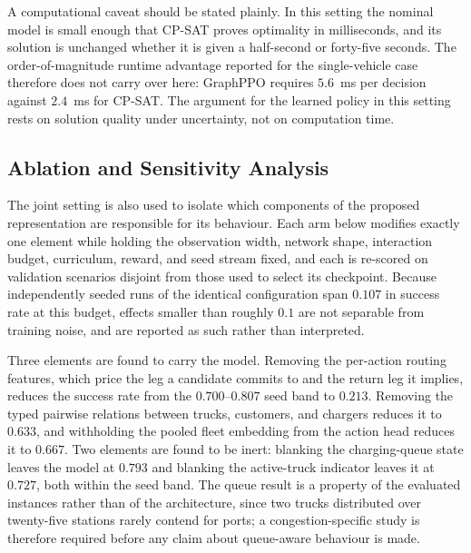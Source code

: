 \documentclass[a4paper,fleqn]{cas-sc}
\begin{document}
A computational caveat should be stated plainly. In this setting the nominal model is small enough that CP-SAT proves optimality in milliseconds, and its solution is unchanged whether it is given a half-second or forty-five seconds. The order-of-magnitude runtime advantage reported for the single-vehicle case therefore does not carry over here: GraphPPO requires $5.6$~ms per decision against $2.4$~ms for CP-SAT. The argument for the learned policy in this setting rests on solution quality under uncertainty, not on computation time.

\subsection{Ablation and Sensitivity Analysis}\label{sec:ablation}

The joint setting is also used to isolate which components of the proposed representation are responsible for its behaviour. Each arm below modifies exactly one element while holding the observation width, network shape, interaction budget, curriculum, reward, and seed stream fixed, and each is re-scored on validation scenarios disjoint from those used to select its checkpoint. Because independently seeded runs of the identical configuration span $0.107$ in success rate at this budget, effects smaller than roughly $0.1$ are not separable from training noise, and are reported as such rather than interpreted.

Three elements are found to carry the model. Removing the per-action routing features, which price the leg a candidate commits to and the return leg it implies, reduces the success rate from the $0.700$--$0.807$ seed band to $0.213$. Removing the typed pairwise relations between trucks, customers, and chargers reduces it to $0.633$, and withholding the pooled fleet embedding from the action head reduces it to $0.667$. Two elements are found to be inert: blanking the charging-queue state leaves the model at $0.793$ and blanking the active-truck indicator leaves it at $0.727$, both within the seed band. The queue result is a property of the evaluated instances rather than of the architecture, since two trucks distributed over twenty-five stations rarely contend for ports; a congestion-specific study is therefore required before any claim about queue-aware behaviour is made.
\end{document}
